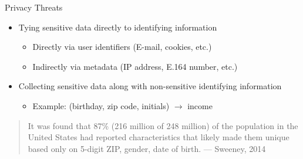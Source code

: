 \documentclass[helvetica]{beamer}
\begin{document}
\begin{frame}{Privacy Threats}

  \begin{itemize}
  \item Tying sensitive data directly to identifying information
    \begin{itemize}
    \item Directly via user identifiers (E-mail, cookies, etc.)
    \item Indirectly via metadata (IP address, E.164 number, etc.)
    \end{itemize}

  \item Collecting sensitive data along with non-sensitive identifying information
    \begin{itemize}
    \item Example: (birthday, zip code, initials) $\rightarrow$ income
      \end{itemize}
  \end{itemize}

  \vspace{1ex}
  \begin{quote}
    It was found that 87\% (216 million of 248 million) of the
    population in the United States had reported characteristics that
    likely made them unique based only on {5-digit ZIP, gender, date of
      birth}. --- Sweeney, 2014~\cite{sweeney2000simple}
    \end{quote}
    
\end{frame}
\end{document}
